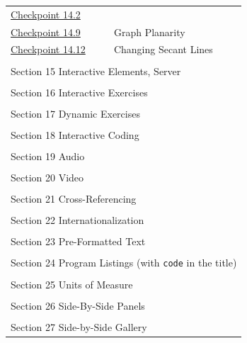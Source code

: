 \documentclass[pdflatex]{sn-jnl}
\theoremstyle{thmstyleone}%
\theoremstyle{thmstyletwo}%
\theoremstyle{thmstylethree}%
\newcommand{\mono}[1]{\texttt{#1}}
\numberwithin{equation}{section}
\begin{document}
\begin{appendices}
\begin{longtable}[l]{ll}
\hyperref[interactive-html5-canvas-5]{Checkpoint 14.2}& \\
\hyperref[section-interactive-authored-8-10]{Checkpoint 14.9}& Graph Planarity\\
\hyperref[svg-interactives-5]{Checkpoint 14.12}& Changing Secant Lines\\
\multicolumn{2}{l}{\null}\\[1.5ex] \multicolumn{2}{l}{\large Section 15 Interactive Elements, Server}\\[0.5ex]
\multicolumn{2}{l}{\null}\\[1.5ex] \multicolumn{2}{l}{\large Section 16 Interactive Exercises}\\[0.5ex]
\multicolumn{2}{l}{\null}\\[1.5ex] \multicolumn{2}{l}{\large Section 17 Dynamic Exercises}\\[0.5ex]
\multicolumn{2}{l}{\null}\\[1.5ex] \multicolumn{2}{l}{\large Section 18 Interactive Coding}\\[0.5ex]
\multicolumn{2}{l}{\null}\\[1.5ex] \multicolumn{2}{l}{\large Section 19 Audio}\\[0.5ex]
\multicolumn{2}{l}{\null}\\[1.5ex] \multicolumn{2}{l}{\large Section 20 Video}\\[0.5ex]
\multicolumn{2}{l}{\null}\\[1.5ex] \multicolumn{2}{l}{\large Section 21 Cross-Referencing}\\[0.5ex]
\multicolumn{2}{l}{\null}\\[1.5ex] \multicolumn{2}{l}{\large Section 22 Internationalization}\\[0.5ex]
\multicolumn{2}{l}{\null}\\[1.5ex] \multicolumn{2}{l}{\large Section 23 Pre-Formatted Text}\\[0.5ex]
\multicolumn{2}{l}{\null}\\[1.5ex] \multicolumn{2}{l}{\large Section 24 Program Listings (with \mono{code} in the title)}\\[0.5ex]
\multicolumn{2}{l}{\null}\\[1.5ex] \multicolumn{2}{l}{\large Section 25 Units of Measure}\\[0.5ex]
\multicolumn{2}{l}{\null}\\[1.5ex] \multicolumn{2}{l}{\large Section 26 Side-By-Side Panels}\\[0.5ex]
\multicolumn{2}{l}{\null}\\[1.5ex] \multicolumn{2}{l}{\large Section 27 Side-by-Side Gallery}\\[0.5ex]

\end{longtable}
\end{appendices}
\end{document}
